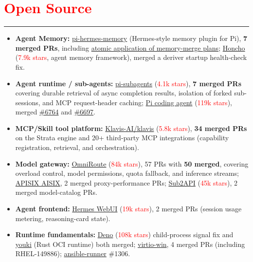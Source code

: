 \documentclass[10pt,a4paper]{article}
\begin{document}
\section*{\textcolor{red}{Open Source}}
\vspace*{-4ex}
\noindent\textcolor{red}{\rule{\linewidth}{0.4pt}}
\begin{itemize}
	\item \textbf{Agent Memory:} \href{https://github.com/chandra447/pi-hermes-memory/pulls?q=author\%3Axz-dev+is\%3Amerged}{pi-hermes-memory} (Hermes-style memory plugin for Pi), \textbf{7 merged PRs}, including \href{https://github.com/chandra447/pi-hermes-memory/pull/142}{atomic application of memory-merge plans}; \href{https://github.com/plastic-labs/honcho/pull/689}{Honcho} (\textcolor{red}{7.9k stars}, agent memory framework), merged a deriver startup health-check fix.
	\item \textbf{Agent runtime / sub-agents:} \href{https://github.com/nicobailon/pi-subagents/pulls?q=author\%3Axz-dev+is\%3Amerged}{pi-subagents} (\textcolor{red}{4.1k stars}), \textbf{7 merged PRs} covering durable retrieval of async completion results, isolation of forked sub-sessions, and MCP request-header caching; \href{https://github.com/earendil-works/pi}{Pi coding agent} (\textcolor{red}{119k stars}), merged \href{https://github.com/earendil-works/pi/pull/6764}{\#6764} and \href{https://github.com/earendil-works/pi/pull/6697}{\#6697}.
	\item \textbf{MCP/Skill tool platform:} \href{https://github.com/Klavis-AI/klavis/pulls?q=author\%3Axz-dev+is\%3Amerged}{Klavis-AI/klavis} (\textcolor{red}{5.8k stars}), \textbf{34 merged PRs} on the Strata engine and 20+ third-party MCP integrations (capability registration, retrieval, and orchestration).
	\item \textbf{Model gateway:} \href{https://github.com/cheaper-inference/OmniRoute/pulls?q=author\%3Axz-dev+is\%3Amerged}{OmniRoute} (\textcolor{red}{84k stars}), 57 PRs with \textbf{50 merged}, covering overload control, model permissions, quota fallback, and inference streams; \href{https://github.com/api7/aisix/pull/1387}{APISIX AISIX}, 2 merged proxy-performance PRs; \href{https://github.com/Wei-Shaw/sub2api/pull/7215}{Sub2API} (\textcolor{red}{45k stars}), 2 merged model-catalog PRs.
	\item \textbf{Agent frontend:} \href{https://github.com/nesquena/hermes-webui}{Hermes WebUI} (\textcolor{red}{19k stars}), 2 merged PRs (session usage metering, reasoning-card state).
	\item \textbf{Runtime fundamentals:} \href{https://github.com/denoland/deno/pull/36644}{Deno} (\textcolor{red}{108k stars}) child-process signal fix and \href{https://github.com/youki-dev/youki/pull/3867}{youki} (Rust OCI runtime) both merged; \href{https://github.com/virtio-win/kvm-guest-drivers-windows/pulls?q=is\%3Apr+author\%3Axz-dev+is\%3Amerged}{virtio-win}, 4 merged PRs (including RHEL-149886); \href{https://github.com/ansible/ansible-runner/pull/1306}{ansible-runner} \#1306.

\end{itemize}
\end{document}
